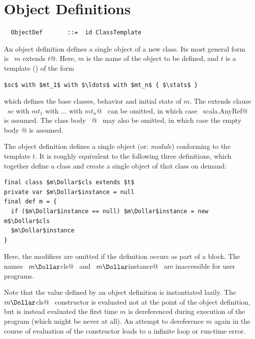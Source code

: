 \section{Object Definitions}
\label{sec:object-defs}

\syntax\begin{lstlisting}
  ObjectDef       ::=  id ClassTemplate
\end{lstlisting}

An object definition defines a single object of a new class. Its 
most general form is
~\lstinline@object $m$ extends $t$@. Here,
$m$ is the name of the object to be defined, and 
$t$ is a template () of the form
\begin{lstlisting}
$sc$ with $mt_1$ with $\ldots$ with $mt_n$ { $\stats$ }
\end{lstlisting}
which defines the base classes, behavior and initial state of $m$.
The extends clause ~\lstinline@extends $sc$ with $mt_1$ with $\ldots$ with $mt_n$@~ 
can be omitted, in which case
~\lstinline@extends scala.AnyRef@~ is assumed.  The class body
~\lstinline@{$\stats\,$}@~ may also be omitted, in which case the empty body
\lstinline@{}@ is assumed.

The object definition defines a single object (or: {\em module})
conforming to the template $t$.  It is roughly equivalent to the
following three definitions, which together define a class and create
a single object of that class on demand:
\begin{lstlisting}
final class $m\Dollar$cls extends $t$ 
private var $m\Dollar$instance = null
final def m = {
  if ($m\Dollar$instance == null) $m\Dollar$instance = new m$\Dollar$cls
  $m\Dollar$instance
}
\end{lstlisting}
Here, the  modifiers are omitted if the definition occurs
as part of a block. The names ~\lstinline@$m\Dollar$cls@~ and
~\lstinline@$m\Dollar$instance@~ are inaccessible for user programs.

Note that the value defined by an object definition is instantiated
lazily.  The ~\lstinline@new $m\Dollar$cls@~ constructor is evaluated
not at the point of the object definition, but is instead evaluated
the first time $m$ is dereferenced during execution of the program
(which might be never at all). An attempt to dereference $m$ again in
the course of evaluation of the constructor leads to a infinite loop
or run-time error.  


